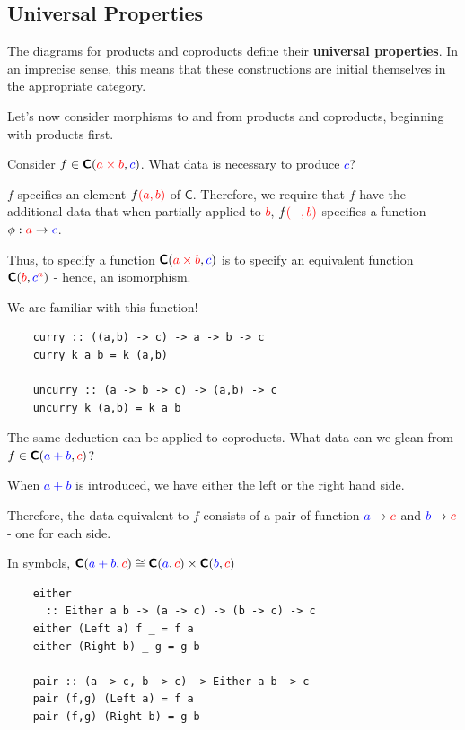 \documentclass[tikz]{beamer}
\newcommand{\cat}[1]{\bm{ \mathsf{#1} }}
\newcommand{\cc}{\cat{C}}
\newcommand{\red}[1]{\textcolor{red}{#1}}
\newcommand{\mred}[1]{\textcolor{red}{$#1$}}
\newcommand{\blue}[1]{\textcolor{blue}{#1}}
\newcommand{\mblue}[1]{\textcolor{blue}{$#1$}}
\theoremstyle{definition}
\begin{document}
\subsection{Universal Properties}
\frame
{
	The diagrams for products and coproducts define their \textbf{universal properties}. In an imprecise sense, this means that these constructions are initial themselves in the appropriate category. 
}

\frame
{
	Let's now consider morphisms to and from products and coproducts, beginning with products first. 
}

\frame
{
	Consider $f \in \cc(\red{a \times b}, \blue{c})$. What data is necessary to produce \mblue{c}? 
}

\frame
{
	$f$ specifies an element $f \red{(a,b)}$ of $\cc$. Therefore, we require that $f$ have the additional data that when partially applied to \mred{b}, $f \red{(-,b)}$ specifies a function $\phi : \red{a} \to \blue{c}$. 
}

\frame
{
	Thus, to specify a function $\cc(\red{a \times b}, \blue{c})$ is to specify an equivalent function $\cc(\red{b}, \blue{c}^{\red{a}})$ - hence, an isomorphism. 
}

\begin{frame}[fragile]

	We are familiar with this function! 
	
	\begin{verbatim}
	curry :: ((a,b) -> c) -> a -> b -> c
	curry k a b = k (a,b)
	
	uncurry :: (a -> b -> c) -> (a,b) -> c
	uncurry k (a,b) = k a b  
	\end{verbatim}
\end{frame}

\frame
{
	The same deduction can be applied to coproducts. What data can we glean from $f \in \cc(\blue{a + b}, \red{c})$? 
}

\frame
{
	When \mblue{a + b} is introduced, we have either the left or the right hand side.
	
	Therefore, the data equivalent to $f$ consists of a pair of function $\blue{a} \to \red{c}$ and $\blue{b} \to \red{c}$ - one for each side. 
}

\frame
{
	In symbols, $\cc(\blue{a + b}, \red{c}) \cong \cc(\blue{a}, \red{c}) \times \cc(\blue{b}, \red{c})$
}

\begin{frame}[fragile]
	\begin{verbatim}
	either 
	  :: Either a b -> (a -> c) -> (b -> c) -> c
	either (Left a) f _ = f a
	either (Right b) _ g = g b
	
	pair :: (a -> c, b -> c) -> Either a b -> c
	pair (f,g) (Left a) = f a
	pair (f,g) (Right b) = g b
	\end{verbatim}
\end{frame}
\end{document}
